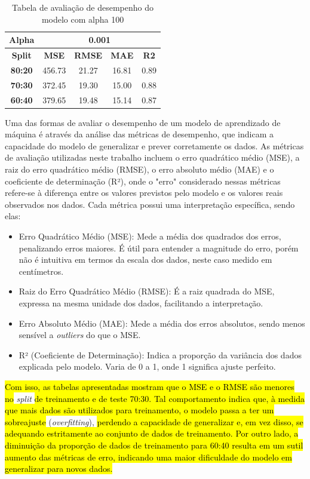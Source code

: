 \begin{table}[H]
\centering
\begin{tabular}{|c|c|c|c|c|}
\hline
\textbf{Alpha} & \multicolumn{4}{|c|}{\textbf{0.001}} \\
\hline
\textbf{Split} & \textbf{MSE} & \textbf{RMSE} & \textbf{MAE} & \textbf{R2} \\
\hline
\textbf{80:20} & 456.73 & 21.27 & 16.81 & 0.89 \\
\textbf{70:30} & 372.45 & 19.30 & 15.00 & 0.88 \\
\textbf{60:40} & 379.65 & 19.48 & 15.14 & 0.87 \\
\hline
\end{tabular}
\caption{Tabela de avaliação de desempenho do modelo com alpha 100}
\label{tab:avaliacao_alpha_100}
\end{table}

Uma das formas de avaliar o desempenho de um modelo de aprendizado de máquina é através da análise das métricas de desempenho, que indicam a capacidade do modelo de generalizar e prever corretamente os dados. As métricas de avaliação utilizadas neste trabalho incluem o erro quadrático médio (MSE), a raiz do erro quadrático médio (RMSE), o erro absoluto médio (MAE) e o coeficiente de determinação (R²), onde o "erro" considerado nessas métricas refere-se à diferença entre os valores previstos pelo modelo e os valores reais observados nos dados. Cada métrica possui uma interpretação específica, sendo elas:

\begin{itemize}
	\item Erro Quadrático Médio (MSE): Mede a média dos quadrados dos erros, penalizando erros maiores. É útil para entender a magnitude do erro, porém não é intuitiva em termos da escala dos dados, neste caso medido em centímetros.
	\item Raiz do Erro Quadrático Médio (RMSE): É a raiz quadrada do MSE, expressa na mesma unidade dos dados, facilitando a interpretação.
	\item Erro Absoluto Médio (MAE): Mede a média dos erros absolutos, sendo menos sensível a \textit{outliers} do que o MSE.
	\item R² (Coeficiente de Determinação): Indica a proporção da variância dos dados explicada pelo modelo. Varia de 0 a 1, onde 1 significa ajuste perfeito.
\end{itemize}

\hl{Com isso, as tabelas apresentadas mostram que o MSE e o RMSE são menores no} \textit{split} \hl{de treinamento e de teste 70:30. Tal comportamento indica que, à medida que mais dados são utilizados para treinamento, o modelo passa a ter um sobreajuste} (\textit{overfitting}), \hl{perdendo a capacidade de generalizar e, em vez disso, se adequando estritamente ao conjunto de dados de treinamento. Por outro lado, a diminuição da proporção de dados de treinamento para 60:40 resulta em um sutil aumento das métricas de erro, indicando uma maior dificuldade do modelo em generalizar para novos dados.}

